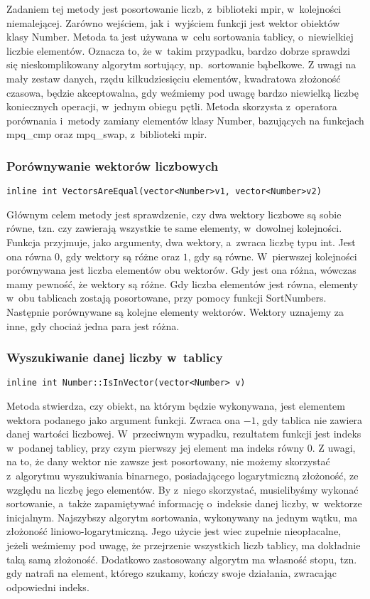 Zadaniem tej metody jest posortowanie liczb, z~biblioteki mpir, w~kolejności niemalejącej. Zarówno wejściem, jak i~wyjściem funkcji jest wektor obiektów klasy Number. Metoda ta jest używana w~celu sortowania tablicy, o~niewielkiej liczbie elementów. Oznacza to, że w~takim przypadku, bardzo dobrze sprawdzi się nieskomplikowany algorytm sortujący, np.\ sortowanie bąbelkowe. Z uwagi na mały zestaw danych, rzędu kilkudziesięciu elementów, kwadratowa złożoność czasowa, będzie akceptowalna, gdy weźmiemy pod uwagę bardzo niewielką liczbę koniecznych operacji, w~jednym obiegu pętli. Metoda skorzysta z~operatora porównania i~metody zamiany elementów klasy Number, bazujących na funkcjach mpq\_cmp oraz mpq\_swap, z~biblioteki mpir.

\subsubsection{Porównywanie wektorów liczbowych}
\begin{lstlisting}
inline int VectorsAreEqual(vector<Number>v1, vector<Number>v2)
\end{lstlisting}

Głównym celem metody jest sprawdzenie, czy dwa wektory liczbowe są sobie równe, tzn. czy zawierają wszystkie te same elementy, w~dowolnej kolejności. Funkcja przyjmuje, jako argumenty, dwa wektory, a~zwraca liczbę typu int. Jest ona równa $0$, gdy wektory są różne oraz $1$, gdy są równe. W~pierwszej kolejności porównywana jest liczba elementów obu wektorów. Gdy jest ona różna, wówczas mamy pewność, że wektory są różne. Gdy liczba elementów jest równa, elementy w~obu tablicach zostają posortowane, przy pomocy funkcji SortNumbers. Następnie porównywane są kolejne elementy wektorów. Wektory uznajemy za inne, gdy chociaż jedna para jest różna.

\subsubsection{Wyszukiwanie danej liczby w~tablicy}
\begin{lstlisting}
inline int Number::IsInVector(vector<Number> v)
\end{lstlisting}

Metoda stwierdza, czy obiekt, na którym będzie wykonywana, jest elementem wektora podanego jako argument funkcji. Zwraca ona $-1$, gdy tablica nie zawiera danej wartości liczbowej. W~przeciwnym wypadku, rezultatem funkcji jest indeks w~podanej tablicy, przy czym pierwszy jej element ma indeks równy $0$. Z uwagi, na to, że dany wektor nie zawsze jest posortowany, nie możemy skorzystać z~algorytmu wyszukiwania binarnego, posiadającego logarytmiczną złożoność, ze względu na liczbę jego elementów. By z~niego skorzystać, musielibyśmy wykonać sortowanie, a~także zapamiętywać informację o~indeksie danej liczby, w~wektorze inicjalnym. Najszybszy algorytm sortowania, wykonywany na jednym wątku, ma złożoność liniowo-logarytmiczną. Jego użycie jest wiec zupełnie nieopłacalne, jeżeli weźmiemy pod uwagę, że przejrzenie wszystkich liczb tablicy, ma dokładnie taką samą złożoność. Dodatkowo zastosowany algorytm ma własność stopu, tzn. gdy natrafi na element, którego szukamy, kończy swoje działania, zwracając odpowiedni indeks.

